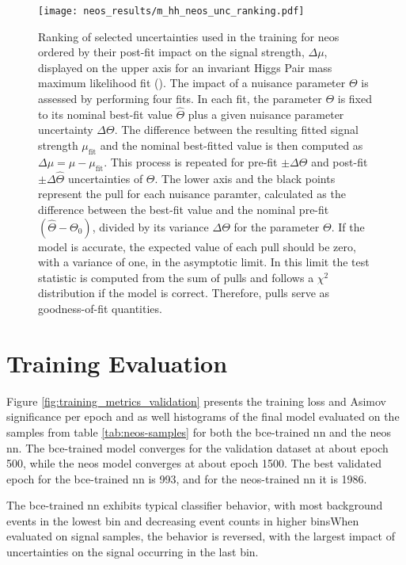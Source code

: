\begin{figure}
    \centering
    \texttt{[image: neos\_results/m\_hh\_neos\_unc\_ranking.pdf]}
    \caption[]{Ranking of selected uncertainties used in the training for \ac{neos} ordered by their post-fit impact on the signal strength, $\Delta\mu$, displayed on the upper axis for an invariant Higgs Pair mass maximum likelihood fit (\mhh{}). The impact of a nuisance parameter $\Theta$ is assessed by performing four fits. In each fit, the parameter $\Theta$ is fixed to its nominal best-fit value $\hat{\Theta}$ plus a given nuisance parameter uncertainty $\Delta\Theta$. The difference between the resulting fitted signal strength $\mu_\text{fit}$ and the nominal best-fitted value is then computed as $\Delta\mu=\hat{\mu} - \mu_\text{fit}$. This process is repeated for pre-fit $\pm\Delta\Theta$ and post-fit $\pm\Delta\hat{\Theta}$ uncertainties of $\Theta$. The lower axis and the black points represent the pull for each nuisance paramter, calculated as the difference between the best-fit value and the nominal pre-fit $(\hat{\Theta} - \Theta_0)$, divided by its variance $\Delta\Theta$ for the parameter $\Theta$. If the model is accurate, the expected value of each pull should be zero, with a variance of one, in the asymptotic limit. In this limit the test statistic is computed from the sum of pulls and follows a $\chi^2$ distribution if the model is correct. Therefore, pulls serve as goodness-of-fit quantities. }
    \label{fig:m_hh_neos_unc_ranking}
\end{figure}




\section{Training Evaluation}
Figure \ref{fig:training_metrics_validation} presents the training loss and Asimov significance per epoch and as well histograms of the final model evaluated on the samples from table \ref{tab:neos-samples} for both the \ac{bce}-trained \ac{nn} and the neos \ac{nn}. The \ac{bce}-trained model converges for the validation dataset at about epoch 500, while the \ac{neos} model converges at about epoch 1500. The best validated epoch for the \ac{bce}-trained \ac{nn} is 993, and for the \ac{neos}-trained \ac{nn} it is 1986.

The \ac{bce}-trained \ac{nn} exhibits typical classifier behavior, with most background events in the lowest bin and decreasing event counts in higher binsWhen evaluated on signal samples, the behavior is reversed, with the largest impact of uncertainties on the signal occurring in the last bin.

